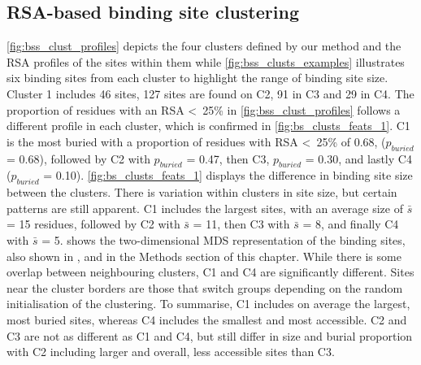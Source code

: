 \vspace{-17pt} %

\subsection{RSA-based binding site clustering}

\autoref{fig:bss_clust_profiles} depicts the four clusters defined by our method and the RSA profiles of the sites within them while \autoref{fig:bss_clusts_examples} illustrates six binding sites from each cluster to highlight the range of binding site size. Cluster 1 includes 46 sites, 127 sites are found on C2, 91 in C3 and 29 in C4. The proportion of residues with an RSA \textless~25\% in \autoref{fig:bss_clust_profiles} follows a different profile in each cluster, which is confirmed in \autoref{fig:bs_clusts_feats_1}. C1 is the most buried with a proportion of residues with RSA \textless~25\% of 0.68, ($p_{buried}$ = 0.68), followed by C2 with $p_{buried}$ = 0.47, then C3, $p_{buried}$ = 0.30, and lastly C4 ($p_{buried}$ = 0.10). \autoref{fig:bs_clusts_feats_1} displays the difference in binding site size between the clusters. There is variation within clusters in site size, but certain patterns are still apparent. C1 includes the largest sites, with an average size of $\bar{s}$ = 15 residues, followed by C2 with $\bar{s}$ = 11, then C3 with $\bar{s}$ = 8, and finally C4 with $\bar{s}$ = 5.  shows the two-dimensional MDS representation of the binding sites, also shown in , and  in the Methods section of this chapter. While there is some overlap between neighbouring clusters, C1 and C4 are significantly different. Sites near the cluster borders are those that switch groups depending on the random initialisation of the clustering. To summarise, C1 includes on average the largest, most buried sites, whereas C4 includes the smallest and most accessible. C2 and C3 are not as different as C1 and C4, but still differ in size and burial proportion with C2 including larger and overall, less accessible sites than C3.

